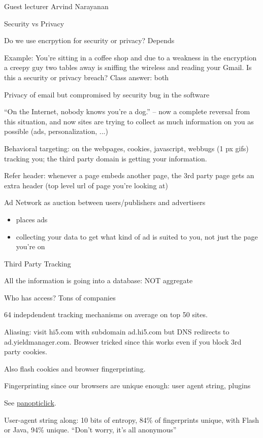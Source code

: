 Guest lecturer Arvind Narayanan

Security vs Privacy

Do we use encrpytion for security or privacy? Depends

Example: You're sitting in a coffee shop and due to a weakness in the encryption
a creepy guy two tables away is sniffing the wireless and reading your Gmail. Is
this a security or privacy breach? Class answer: both

Privacy of email but compromised by security bug in the software

``On the Internet, nobody knows you're a dog.'' -- now a complete reversal from
this situation, and now sites are trying to collect as much information on you
as possible (ads, personalization, ...)

Behavioral targeting: on the webpages, cookies, javascript, webbugs (1 px gifs)
tracking you; the third party domain is getting your information.

Refer header: whenever a page embeds another page, the 3rd party page gets an
extra header (top level url of page you're looking at)

Ad Network as auction between users/publishers and advertisers
\begin{itemize}
\item places ads
\item collecting your data to get what kind of ad is suited to you, not just the
page you're on
\end{itemize}

Third Party Tracking

All the information is going into a database: NOT aggregate

Who has access? Tons of companies

64 indepdendent tracking mechanisms on average on top 50 sites.

Aliasing: visit hi5.com with subdomain ad.hi5.com but DNS redirects to
ad.yieldmanager.com. Browser tricked since this works even if you block 3rd
party cookies.

Also flash cookies and browser fingerprinting.

Fingerprinting since our browsers are unique enough: user agent string, plugins

See \href{https://panopticlick.eff.org/}{panopticlick}.

User-agent string along: 10 bits of entropy, 84\% of fingerprints unique, with
Flash or Java, 94\% unique.
``Don't worry, it's all anonymous''

